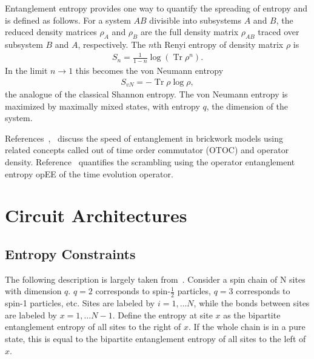 \documentclass[11pt]{article}
\newcommand{\half}{\frac{1}{2}}
\renewcommand{\th}[1]{\frac{1}{#1}}
\DeclareMathOperator{\Tr}{Tr}
\begin{document}
Entanglement entropy provides one way to quantify the spreading of entropy and is defined as follows. For a system $AB$ divisible into subsystems $A$ and $B$, the reduced density matrices $\rho_A$ and $\rho_B$ are the full density matrix $\rho_{AB}$ traced over subsystem $B$ and $A$, respectively. The $n$th Renyi entropy of density matrix $\rho$ is 
\begin{align}
S_n = \th{1-n}\log\left(\Tr\rho^n\right). \label{eqn:renyi}
\end{align}
In the limit $n\to1$ this becomes the von Neumann entropy
\begin{align}
S_{vN} = -\Tr\rho\log\rho,
\end{align}
the analogue of the classical Shannon entropy. The von Neumann entropy is maximized by maximally mixed states, with entropy $q$, the dimension of the system.

References~\cite{Keyserlingk},~\cite{Jonay} discuss the speed of entanglement in brickwork models using related concepts called out of time order commutator (OTOC) and operator density. Reference~\cite{Zhou2017} quantifies the scrambling using the operator entanglement entropy opEE of the time evolution operator.

\section{Circuit Architectures} \label{sec:arch}

\subsection{Entropy Constraints} \emph{ }\label{sub:constraints}

The following description is largely taken from~\cite{Nahum2017}. Consider a spin chain of N sites with dimension $q$. $q=2$ corresponds to spin-$\half$ particles, $q=3$ corresponds to spin-1 particles, etc. Sites are labeled by $i=1,\dots N$, while the bonds between sites are labeled by $x = 1,\dots N-1$. Define the entropy at site $x$ as the bipartite entanglement entropy of all sites to the right of $x$. If the whole chain is in a pure state, this is equal to the bipartite entanglement entropy of all sites to the left of $x$.
\end{document}
